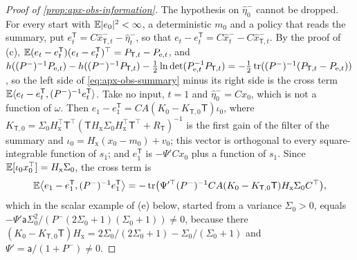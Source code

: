 \begin{proof}[Proof of \cref{prop:apx-obs-information}]
The hypothesis on $\hat\eta^-_0$ cannot be dropped. For every start with $\mathbb{E}\lvert e_0\rvert^2<\infty$, a deterministic $m_0$ and a policy that reads the summary, put $e^{\mathsf T}_t=C\hat x^-_{\mathsf T,t}-\hat\eta^-_t$, so that $e_t-e^{\mathsf T}_t=C\hat x^-_t-C\hat x^-_{\mathsf T,t}$. By the proof of (c), $\mathbb{E}(e_t-e^{\mathsf T}_t)(e_t-e^{\mathsf T}_t)^\top=P_{\mathsf T,t}-P_{\mathrm e,t}$, and $h((P^-)^{-1}P_{\mathrm e,t})-h((P^-)^{-1}P_{\mathsf T,t})-\frac12\ln\det(P_{\mathrm e,t}^{-1}P_{\mathsf T,t})=-\frac12\operatorname{tr}((P^-)^{-1}(P_{\mathsf T,t}-P_{\mathrm e,t}))$, so the left side of \eqref{eq:apx-obs-summary} minus its right side is the cross term $\mathbb{E}\langle e_t-e^{\mathsf T}_t,(P^-)^{-1}e^{\mathsf T}_t\rangle$. Take no input, $t=1$ and $\hat\eta^-_0=Cx_0$, which is not a function of $\omega$. Then $e_1-e^{\mathsf T}_1=CA(K_0-K_{\mathsf T,0}\mathsf T)\iota_0$, where $K_{\mathsf T,0}=\Sigma_0H_{\mathrm x}^\top\mathsf T^\top(\mathsf TH_{\mathrm x}\Sigma_0H_{\mathrm x}^\top\mathsf T^\top+R_{\mathsf T})^{-1}$ is the first gain of the filter of the summary and $\iota_0=H_{\mathrm x}(x_0-m_0)+v_0$; this vector is orthogonal to every square-integrable function of $s_1$; and $e^{\mathsf T}_1$ is $-\Psi'Cx_0$ plus a function of $s_1$. Since $\mathbb{E}[\iota_0x_0^\top]=H_{\mathrm x}\Sigma_0$, the cross term is
\begin{equation*}
\mathbb{E}\bigl\langle e_1-e^{\mathsf T}_1,(P^-)^{-1}e^{\mathsf T}_1\bigr\rangle=-\operatorname{tr}\bigl(\Psi'^\top(P^-)^{-1}CA(K_0-K_{\mathsf T,0}\mathsf T)H_{\mathrm x}\Sigma_0C^\top\bigr),
\end{equation*}
which in the scalar example of (e) below, started from a variance $\Sigma_0>0$, equals $-\Psi'\mathsf a\Sigma_0^2/(P^-(2\Sigma_0+1)(\Sigma_0+1))\ne0$, because there $(K_0-K_{\mathsf T,0}\mathsf T)H_{\mathrm x}=2\Sigma_0/(2\Sigma_0+1)-\Sigma_0/(\Sigma_0+1)$ and $\Psi'=\mathsf a/(1+P^-)\ne0$.


\end{proof}

